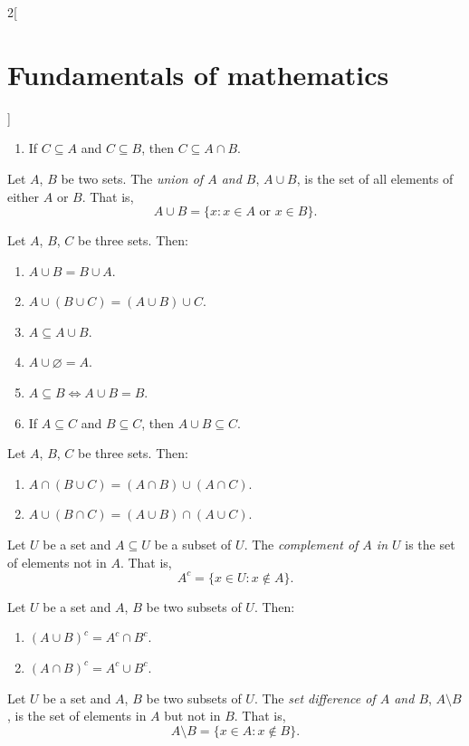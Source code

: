 \documentclass[../../../main.tex]{subfiles}
\begin{document}
\begin{multicols}{2}[\section{Fundamentals of mathematics}]
\begin{prop}
\begin{enumerate}
        \item If $C\subseteq A$ and $C\subseteq B$, then $C\subseteq A\cap B$.
    \end{enumerate}
\end{prop}
\begin{definition}
    Let $A$, $B$ be two sets. The \textit{union of $A$ and $B$}, $A\cup B$, is the set of all elements of either $A$ or $B$. That is, $$A\cup B=\{x:x\in A\text{ or }x\in B\}.$$
\end{definition}
\begin{prop}
    Let $A$, $B$, $C$ be three sets. Then:
    \begin{enumerate}
        \item $A\cup B=B\cup A$.
        \item $A\cup(B\cup C)=(A\cup B)\cup C$.
        \item $A\subseteq A\cup B$.
        \item $A\cup\varnothing=A$.
        \item $A\subseteq B\iff A\cup B=B$.
        \item If $A\subseteq C$ and $B\subseteq C$, then $A\cup B\subseteq C$.
    \end{enumerate}
\end{prop}
\begin{prop}
    Let $A$, $B$, $C$ be three sets. Then:
    \begin{enumerate}
        \item $A\cap (B\cup C)=(A\cap B)\cup (A\cap C)$.
        \item $A\cup (B\cap C)=(A\cup B)\cap (A\cup C)$.
    \end{enumerate}
\end{prop}
\begin{definition}
    Let $U$ be a set and $A\subseteq U$ be a subset of $U$. The \textit{complement of $A$ in $U$} is the set of elements not in $A$. That is, $$A^c=\{x\in U:x\notin A\}.$$
\end{definition}
\begin{prop}
    Let $U$ be a set and $A$, $B$ be two subsets of $U$. Then:
    \begin{enumerate}
        \item $(A\cup B)^c=A^c\cap B^c$.
        \item $(A\cap B)^c=A^c\cup B^c$.
    \end{enumerate}
\end{prop}
\begin{definition}
    Let $U$ be a set and $A$, $B$ be two subsets of $U$. The \textit{set difference of $A$ and $B$}, $A\setminus B$, is the set of elements in $A$ but not in $B$. That is, $$A\setminus B=\{x\in A:x\notin B\}.$$

\end{definition}
\end{multicols}
\end{document}
